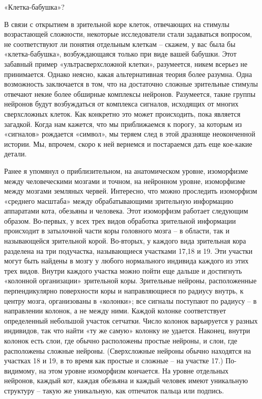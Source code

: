 \documentclass[../main.tex]{subfiles}
\begin{document}
«Клетка-бабушка»?

В связи с открытием в зрительной коре клеток, отвечающих на стимулы возрастающей сложности, некоторые исследователи стали задаваться вопросом, не соответствуют ли понятия отдельным клеткам \--- скажем, у вас была бы «клетка-бабушка», возбуждающаяся только при виде вашей бабушки. Этот забавный пример «ультрасверхсложной клетки», разумеется, никем всерьез не принимается. Однако неясно, какая альтернативная теория более разумна. Одна возможность заключается в том, что на достаточно сложные зрительные стимулы отвечают некие более обширные комплексы нейронов. Разумеется, такие группы нейронов будут возбуждаться от комплекса сигналов, исходящих от многих сверхсложных клеток. Как конкретно это может происходить, пока является загадкой. Когда нам кажется, что мы приближаемся к порогу, за которым из «сигналов» рождается «символ», мы теряем след в этой дразняще неоконченной истории. Мы, впрочем, скоро к ней вернемся и постараемся дать еще кое-какие детали.

Ранее я упомянул о приблизительном, на анатомическом уровне, изоморфизме между человеческими мозгами и точном, на нейронном уровне, изоморфизме между мозгами земляных червей. Интересно, что можно проследить изоморфизм «среднего масштаба» между обрабатывающими зрительную информацию аппаратами кота, обезьяны и человека. Этот изоморфизм работает следующим образом. Во-первых, у всех трех видов обработка зрительной информации происходит в затылочной части коры головного мозга \--- в области, так и называющейся зрительной корой. Во-вторых, у каждого вида зрительная кора разделена на три подучастка, называющиеся участками 17,18 и 19. Эти участки могут быть найдены в мозгу у любого нормального индивида каждого из этих трех видов. Внутри каждого участка можно пойти еще дальше и достигнуть «колонной организации» зрительной коры. Зрительные нейроны, расположенные перпендикулярно поверхности коры и направляющиеся по радиусу внутрь, к центру мозга, организованы в «колонки»; все сигналы поступают по радиусу \--- в направлении колонок, а не между ними. Каждой колонке соответствует определенный небольшой участок сетчатки. Число колонок варьируется у разных индивидов, так что найти «ту же самую» колонку не удается. Наконец, внутри колонок есть слои, где обычно расположены простые нейроны, и слои, где расположены сложные нейроны. (Сверхсложные нейроны обычно находятся на участках 18 и 19, в то время как простые и сложные \--- на участке 17.) По-видимому, на этом уровне изоморфизм кончается. На уровне отдельных нейронов, каждый кот, каждая обезьяна и каждый человек имеют уникальную структуру \--- такую же уникальную, как отпечаток пальца или подпись.
\end{document}
